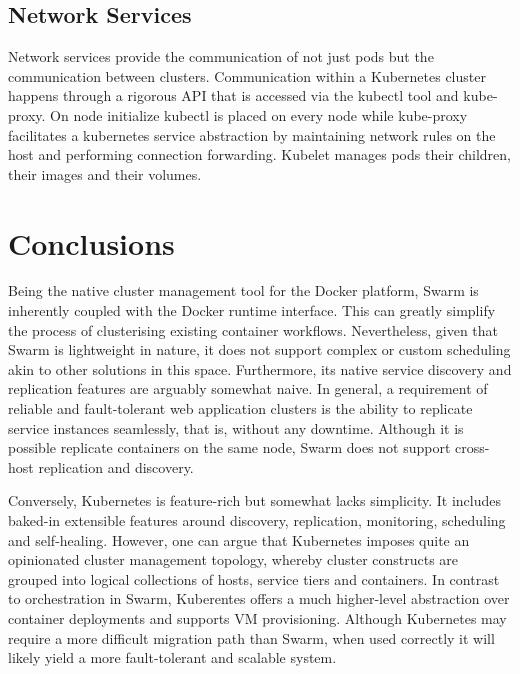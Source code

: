 \documentclass{article}
\begin{document}
\subsection{Network Services}
Network services provide the communication of not just pods but the communication between clusters. Communication within a Kubernetes cluster happens through a rigorous API that is accessed via the kubectl tool and kube-proxy. On node initialize kubectl is placed on every node while kube-proxy facilitates a kubernetes service abstraction by maintaining network rules on the host and performing connection forwarding. Kubelet manages pods their children, their images and their volumes.

\section{Conclusions}
Being the native cluster management tool for the Docker platform, Swarm is inherently coupled with the Docker runtime interface. This can greatly simplify the process of clusterising existing container workflows. Nevertheless, given that Swarm is lightweight in nature, it does not support complex or custom scheduling akin to other solutions in this space. Furthermore, its native service discovery and replication features are arguably somewhat naive. In general, a requirement of reliable and fault-tolerant web application clusters is the ability to replicate service instances seamlessly, that is, without any downtime. Although it is possible replicate containers on the same node, Swarm does not support cross-host replication and discovery. 
\par
Conversely, Kubernetes is feature-rich but somewhat lacks simplicity. It includes baked-in extensible features around discovery, replication, monitoring, scheduling and self-healing. However, one can argue that Kubernetes imposes quite an opinionated cluster management topology, whereby cluster constructs are grouped into logical collections of hosts, service tiers and containers. In contrast to orchestration in Swarm, Kuberentes offers a much higher-level abstraction over container deployments and supports VM provisioning. Although Kubernetes may require a more difficult migration path than Swarm, when used correctly it will likely yield a more fault-tolerant and scalable system.

\vspace{-7.5mm}
\renewcommand{\refname}{\section{References}}

\end{document}
